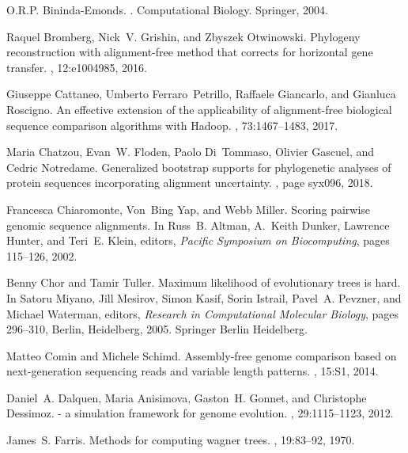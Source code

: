 \documentclass[review]{elsarticle}
\begin{document}
{\begin{thebibliography}{10}
O.R.P. Bininda-Emonds.
.
\newblock Computational Biology. Springer, 2004.

Raquel Bromberg, Nick~V. Grishin, and Zbyszek Otwinowski.
\newblock Phylogeny reconstruction with alignment-free method that corrects for
  horizontal gene transfer.
, 12:e1004985, 2016.

Giuseppe Cattaneo, Umberto Ferraro~Petrillo, Raffaele Giancarlo, and Gianluca
  Roscigno.
\newblock An effective extension of the applicability of alignment-free
  biological sequence comparison algorithms with {H}adoop.
, 73:1467--1483, 2017.

Maria Chatzou, Evan~W. Floden, Paolo Di~Tommaso, Olivier Gascuel, and Cedric
  Notredame.
\newblock Generalized bootstrap supports for phylogenetic analyses of protein
  sequences incorporating alignment uncertainty.
, page syx096, 2018.

Francesca Chiaromonte, Von~Bing Yap, and Webb Miller.
\newblock Scoring pairwise genomic sequence alignments.
\newblock In Russ~B. Altman, A.~Keith Dunker, Lawrence Hunter, and Teri~E.
  Klein, editors, {\em Pacific Symposium on Biocomputing}, pages 115--126,
  2002.

Benny Chor and Tamir Tuller.
\newblock Maximum likelihood of evolutionary trees is hard.
\newblock In Satoru Miyano, Jill Mesirov, Simon Kasif, Sorin Istrail, Pavel~A.
  Pevzner, and Michael Waterman, editors, {\em Research in Computational
  Molecular Biology}, pages 296--310, Berlin, Heidelberg, 2005. Springer Berlin
  Heidelberg.

Matteo Comin and Michele Schimd.
\newblock Assembly-free genome comparison based on next-generation sequencing
  reads and variable length patterns.
, 15:S1, 2014.

Daniel~A. Dalquen, Maria Anisimova, Gaston~H. Gonnet, and Christophe Dessimoz.
 - a simulation framework for genome evolution.
, 29:1115--1123, 2012.

James~S. Farris.
\newblock Methods for computing wagner trees.
, 19:83--92, 1970.


\end{thebibliography}}
\end{document}
